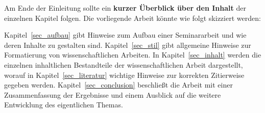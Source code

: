 \bigskip

Am Ende der Einleitung sollte ein \textbf{kurzer Überblick über den Inhalt} der einzelnen Kapitel folgen. 
Die vorliegende Arbeit könnte wie folgt skizziert werden:

\bigskip

Kapitel~\ref{sec_aufbau} gibt Hinweise zum Aufbau einer Seminararbeit und wie deren Inhalte zu gestalten sind.
Kapitel~\ref{sec_stil} gibt allgemeine Hinweise zur Formatierung von wissenschaftlichen Arbeiten.
In Kapitel~\ref{sec_inhalt} werden die einzelnen inhaltlichen Bestandteile der wissenschaftlichen Arbeit dargestellt, worauf in Kapitel~\ref{sec_literatur} wichtige Hinweise zur korrekten Zitierweise gegeben werden.
Kapitel~\ref{sec_conclusion} beschließt die Arbeit mit einer Zusammenfassung der Ergebnisse und einem Ausblick auf die weitere Entwicklung des eigentlichen Themas.


